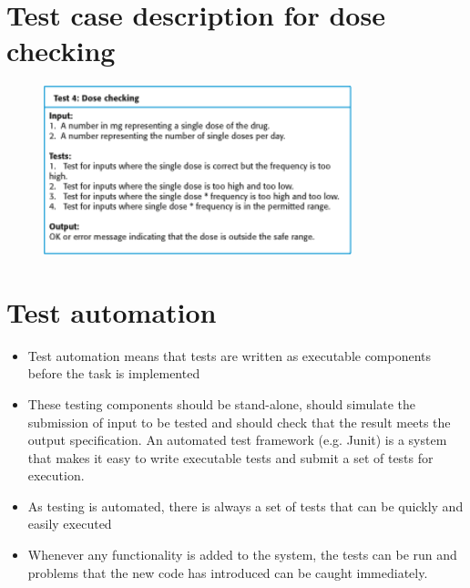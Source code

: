 \section{ Test case description for dose checking}
\begin{figure}[h!]
    \centering
    \includegraphics[width = 0.8\textwidth]{./figures/L2_6.png}
    \caption{}
    \label{fig:L2_6}
\end{figure}

\section{ Test automation}
\begin{itemize}
\item Test automation means that tests are written as executable components before the task is implemented

\item These testing components should be stand-alone, should simulate the submission of input to be tested and should check that the result meets the output specification. An automated test framework (e.g. Junit) is a system that makes it easy to write executable tests and submit a set of tests for execution.

\item As testing is automated, there is always a set of tests that can be quickly and easily executed

\item Whenever any functionality is added to the system, the tests can be run and problems that the new code has introduced can be caught immediately.


\end{itemize}
